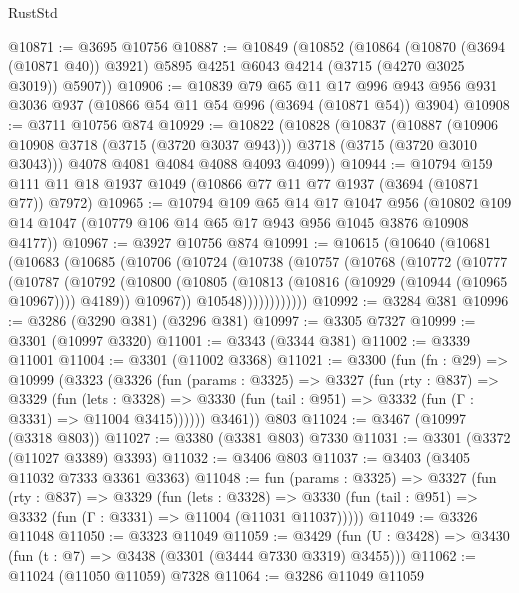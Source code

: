 \begin{lexlean}{RustStd}
\begin{coremodule}
@10871 := @3695 @10756
@10887 := @10849
    (@10852
      (@10864
        (@10870 (@3694 (@10871 @40)) @3921)
        @5895
        @4251
        @6043
        @4214
        (@3715 (@4270 @3025 @3019))
        @5907))
@10906 := @10839
    @79
    @65
    @11
    @17
    @996
    @943
    @956
    @931
    @3036
    @937
    (@10866 @54 @11 @54 @996 (@3694 (@10871 @54)) @3904)
@10908 := @3711 @10756 @874
@10929 := @10822
    (@10828
      (@10837
        (@10887 (@10906 @10908 @3718 (@3715 (@3720 @3037 @943))) @3718 (@3715 (@3720 @3010 @3043)))
        @4078
        @4081
        @4084
        @4088
        @4093
        @4099))
@10944 := @10794 @159 @111 @11 @18 @1937 @1049 (@10866 @77 @11 @77 @1937 (@3694 (@10871 @77)) @7972)
@10965 := @10794
    @109
    @65
    @14
    @17
    @1047
    @956
    (@10802 @109 @14 @1047 (@10779 @106 @14 @65 @17 @943 @956 @1045 @3876 @10908 @4177))
@10967 := @3927 @10756 @874
@10991 := @10615
    (@10640
      (@10681
        (@10683
          (@10685
            (@10706
              (@10724
                (@10738
                  (@10757
                    (@10768
                      (@10772
                        (@10777
                          (@10787
                            (@10792
                              (@10800
                                (@10805 (@10813 (@10816 (@10929 (@10944 (@10965 @10967)))) @4189))
                                @10967))
                            @10548))))))))))))
@10992 := @3284 @381
@10996 := @3286 (@3290 @381) (@3296 @381)
@10997 := @3305 @7327
@10999 := @3301 (@10997 @3320)
@11001 := @3343 (@3344 @381)
@11002 := @3339 @11001
@11004 := @3301 (@11002 @3368)
@11021 := @3300
    (fun (fn : @29) =>
    @10999
      (@3323
        (@3326
          (fun (params : @3325) =>
          @3327
            (fun (rty : @837) =>
            @3329
              (fun (lets : @3328) =>
              @3330 (fun (tail : @951) => @3332 (fun (Γ : @3331) => @11004 @3415))))))
        @3461))
    @803
@11024 := @3467 (@10997 (@3318 @803))
@11027 := @3380 (@3381 @803) @7330
@11031 := @3301 (@3372 (@11027 @3389) @3393)
@11032 := @3406 @803
@11037 := @3403 (@3405 @11032 @7333 @3361 @3363)
@11048 := fun (params : @3325) =>
  @3327
    (fun (rty : @837) =>
    @3329
      (fun (lets : @3328) =>
      @3330 (fun (tail : @951) => @3332 (fun (Γ : @3331) => @11004 (@11031 @11037)))))
@11049 := @3326 @11048
@11050 := @3323 @11049
@11059 := @3429 (fun (U : @3428) => @3430 (fun (t : @7) => @3438 (@3301 (@3444 @7330 @3319) @3455)))
@11062 := @11024 (@11050 @11059) @7328
@11064 := @3286 @11049 @11059

\end{coremodule}
\end{lexlean}
